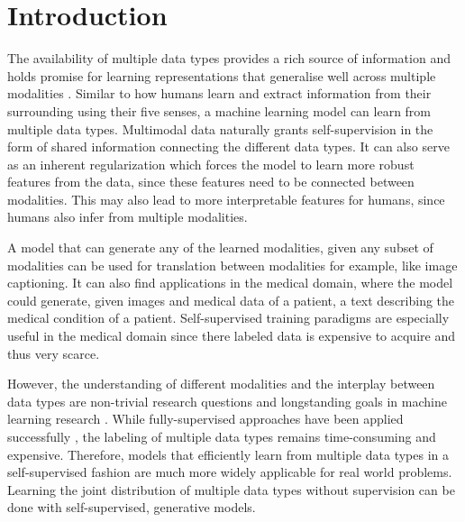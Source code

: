 \section{Introduction}
The availability of multiple data types provides a rich source of information and holds promise for learning representations that generalise well across multiple modalities \parencite{baltrusaitis_multimodal_2019}.
Similar to how humans learn and extract information from their surrounding using their five senses, a machine learning model can learn from multiple data types.
Multimodal data naturally grants self-supervision in the form of shared information connecting the different data types.
It can also serve as an inherent regularization which forces the model to learn more robust features from the data, since these features need to be connected between modalities.
This may also lead to more interpretable features for humans, since humans also infer from multiple modalities.

A model that can generate any of the learned modalities, given any subset of modalities can be used for translation between modalities for example, like image captioning.
It can also find applications in the medical domain, where the model could generate, given images and medical data of a patient, a text describing the medical condition of a patient.
Self-supervised training paradigms are especially useful in the medical domain since there labeled data is expensive to acquire and thus very scarce.

However, the understanding of different modalities and the interplay between data types are non-trivial research questions and longstanding goals in machine learning research \citep{ngiam_multimodal_nodate}.
While fully-supervised approaches have been applied successfully \parencite{karpathy_deep_2015,tsai_learning_2018}, the labeling of multiple data types remains time-consuming and expensive.
Therefore, models that efficiently learn from multiple data types in a self-supervised fashion are much more widely applicable for real world problems.
Learning the joint distribution of multiple data types without supervision can be done with self-supervised, generative models.

